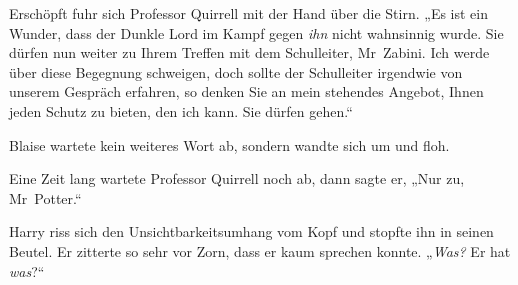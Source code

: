 Erschöpft fuhr sich Professor Quirrell mit der Hand über die Stirn. „Es ist ein Wunder, dass der Dunkle Lord im Kampf gegen \emph{ihn} nicht wahnsinnig wurde. Sie dürfen nun weiter zu Ihrem Treffen mit dem Schulleiter, Mr~Zabini. Ich werde über diese Begegnung schweigen, doch sollte der Schulleiter irgendwie von unserem Gespräch erfahren, so denken Sie an mein stehendes Angebot, Ihnen jeden Schutz zu bieten, den ich kann. Sie dürfen gehen.“

Blaise wartete kein weiteres Wort ab, sondern wandte sich um und floh.

\later

Eine Zeit lang wartete Professor Quirrell noch ab, dann sagte er, „Nur zu, Mr~Potter.“

Harry riss sich den Unsichtbarkeitsumhang vom Kopf und stopfte ihn in seinen Beutel. Er zitterte so sehr vor Zorn, dass er kaum sprechen konnte. „\emph{Was?} Er hat \emph{was}?“

